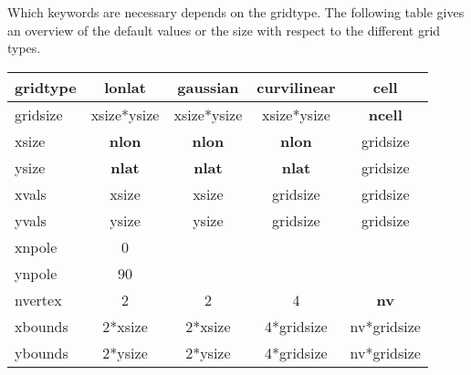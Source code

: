 \vspace{4mm}

Which keywords are necessary depends on the gridtype.
The following table gives an overview of the default values or the size
with respect to the different grid types.


\vspace{2mm}
\hspace{2cm}
\begin{tabular}[c]{|l||c|c|c|c|}
\hline
gridtype   & lonlat      & gaussian    & curvilinear & cell \\
\hline
\hline
gridsize   & xsize*ysize & xsize*ysize & xsize*ysize & {\bf ncell} \\
\hline
xsize      & {\bf nlon} & {\bf nlon} & {\bf nlon} & gridsize \\
\hline
ysize      & {\bf nlat} & {\bf nlat} & {\bf nlat} & gridsize \\
\hline
xvals      & xsize & xsize & gridsize & gridsize \\
\hline
yvals      & ysize & ysize & gridsize & gridsize \\
\hline
xnpole     & 0     &       &          &          \\
\hline
ynpole     & 90    &       &          &          \\
\hline
nvertex    & 2 & 2 & 4 & {\bf nv} \\
\hline
xbounds    & 2*xsize & 2*xsize & 4*gridsize & nv*gridsize \\
\hline
ybounds    & 2*ysize & 2*ysize & 4*gridsize & nv*gridsize \\
\hline
\end{tabular}

